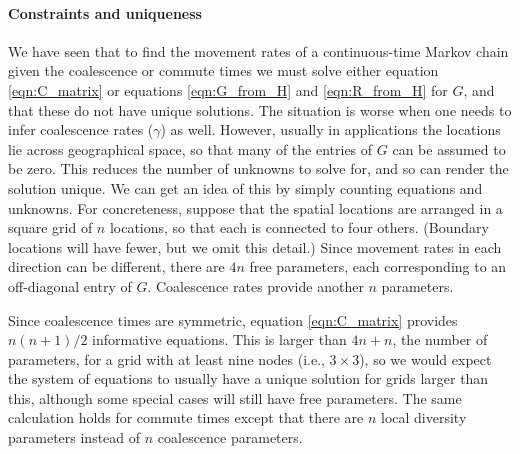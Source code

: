 \documentclass{article}
\begin{document}
\paragraph{Constraints and uniqueness}
We have seen that to find the movement rates of a continuous-time Markov chain
given the coalescence or commute times
we must solve either equation \eqref{eqn:C_matrix} 
or equations \eqref{eqn:G_from_H} and \eqref{eqn:R_from_H} for $G$,
and that these do not have unique solutions.
The situation is worse when one needs to infer coalescence rates ($\gamma$) as well.
However, usually in applications the locations lie across geographical space,
so that many of the entries of $G$ can be assumed to be zero.
This reduces the number of unknowns to solve for,
and so can render the solution unique.
We can get an idea of this by simply counting equations and unknowns.
For concreteness, suppose that the spatial locations
are arranged in a square grid of $n$ locations,
so that each is connected to four others.
(Boundary locations will have fewer, but we omit this detail.)
Since movement rates in each direction can be different,
there are $4n$ free parameters, each corresponding to an off-diagonal entry of $G$.
Coalescence rates provide another $n$ parameters.

Since coalescence times are symmetric, 
equation \eqref{eqn:C_matrix} provides $n (n+1)/2$ informative equations.
This is larger than $4n+n$, the number of parameters,
for a grid with at least nine nodes (i.e., $3 \times 3$),
so we would expect the system of equations to usually have a unique solution
for grids larger than this,
although some special cases will still have free parameters. 
The same calculation holds for commute times 
except that there are $n$ local diversity parameters instead of $n$ coalescence parameters.
\end{document}
